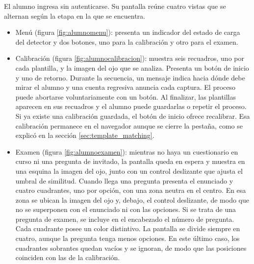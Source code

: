 
El alumno ingresa sin autenticarse. Su pantalla reúne cuatro vistas que se alternan según la etapa en la que se encuentra.

\begin{itemize}

\item Menú (figura \ref{fig:alumnomenu}): presenta un indicador del estado de carga del detector y dos botones, uno para la calibración y otro para el examen.

\item Calibración (figura \ref{fig:alumnocalibracion}): muestra seis recuadros, uno por cada plantilla, y la imagen del ojo que se analiza. Presenta un botón de inicio y uno de retorno. Durante la secuencia, un mensaje indica hacia dónde debe mirar el alumno y una cuenta regresiva anuncia cada captura. El proceso puede abortarse voluntariamente con un botón. Al finalizar, las plantillas aparecen en sus recuadros y el alumno puede guardarlas o repetir el proceso. Si ya existe una calibración guardada, el botón de inicio ofrece recalibrar. Esa calibración permanece en el navegador aunque se cierre la pestaña, como se explicó en la sección \ref{sec:template_matching}.

\item Examen (figura \ref{fig:alumnoexamen}): mientras no haya un cuestionario en curso ni una pregunta de invitado, la pantalla queda en espera y muestra en una esquina la imagen del ojo, junto con un control deslizante que ajusta el umbral de similitud. Cuando llega una pregunta presenta el enunciado y cuatro cuadrantes, uno por opción, con una zona neutra en el centro. En esa zona se ubican la imagen del ojo y, debajo, el control deslizante, de modo que no se superponen con el enunciado ni con las opciones. Si se trata de una pregunta de examen, se incluye en el encabezado el número de pregunta. Cada cuadrante posee un color distintivo. La pantalla se divide siempre en cuatro, aunque la pregunta tenga menos opciones. En este último caso, los cuadrantes sobrantes quedan vacíos y se ignoran, de modo que las posiciones coinciden con las de la calibración.


\end{itemize}
